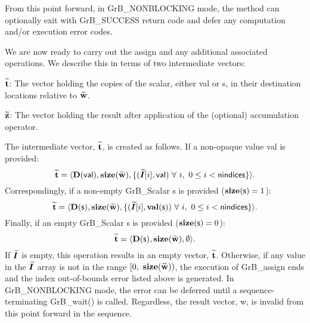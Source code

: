 From this point forward, in {\sf GrB\_NONBLOCKING} mode, the method can 
optionally exit with {\sf GrB\_SUCCESS} return code and defer any computation 
and/or execution error codes.

We are now ready to carry out the assign and any additional 
associated operations.  We describe this in terms of two intermediate vectors:
\begin{itemize}
{\color{red}
    \item ${\bf \widetilde{t}}$: The vector holding the copies of the scalar, either 
	{\sf val} or {\sf s}, in their destination locations relative to 
    ${\bf \widetilde{w}}$.
}

    \item ${\bf \widetilde{z}}$: The vector holding the result after 
    application of the (optional) accumulation operator.
\end{itemize}

{\color{red}
The intermediate vector, ${\bf \widetilde{t}}$, is created as follows. If a non-opaque value {\sf val} is provided:
\[
{\bf \widetilde{t}} = \langle
\bold{D}({\sf val}), \bold{size}({\bf \widetilde{w}}),
\{(\bm{\widetilde{I}}[i],{\sf val})\ \forall \ i,\ 0 \leq i < {\sf nindices} \} \rangle. 
\]
Correspondingly, if a non-empty {\sf GrB\_Scalar} {\sf s} is provided ($\mathbf{size}({\sf s}) = 1$):
\[
{\bf \widetilde{t}} = \langle
\bold{D}({\sf s}), \bold{size}({\bf \widetilde{w}}),
\{(\bm{\widetilde{I}}[i],\mathbf{val}({\sf s}))\ \forall \ i,\ 0 \leq i < {\sf nindices} \} \rangle. 
\]
Finally, if an empty {\sf GrB\_Scalar} {\sf s} is provided ($\mathbf{size}({\sf s}) = 0$):
\[
{\bf \widetilde{t}} = \langle
\bold{D}({\sf s}), \bold{size}({\bf \widetilde{w}}),
\emptyset \rangle. 
\]
}
If $\bm{\widetilde{I}}$ is empty, this operation results in an empty 
vector, ${\bf \widetilde{t}}$.  Otherwise, if any value in the 
$\bm{\widetilde{I}}$ array is not in the range 
$[0,\ \bold{size}({\bf \widetilde{w}}) )$, the execution of {\sf GrB\_assign} 
ends and the index out-of-bounds error listed above is generated. In 
{\sf GrB\_NONBLOCKING} mode, the error can be deferred until a 
sequence-terminating {\sf GrB\_wait()} is called.  Regardless, the result 
vector, {\sf w}, is invalid from this point forward in the 
sequence.

